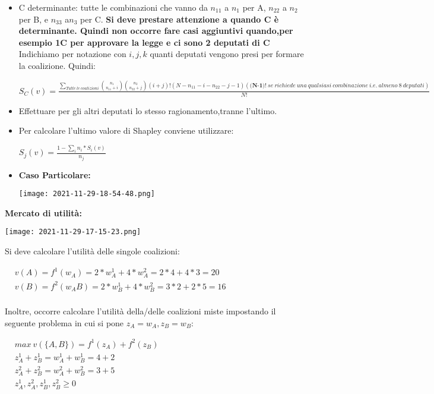\documentclass{article}
\theoremstyle{definition}
\theoremstyle{remark}
\begin{document}
\begin{itemize}
    \item C determinante: tutte le combinazioni che vanno da \(n_11\) a \(n_1\) per A, \(n_22\) a \(n_2\) per B, e \(n_33\) a\(n_3\) per C.\newline
    \textbf{Si deve prestare attenzione a quando C è determinante. Quindi non occorre fare casi aggiuntivi quando,per esempio 1C per approvare la legge e ci sono 2 deputati di C}\newline
    Indichiamo per notazione con \(i,j,k\) quanti deputati vengono presi per formare la coalizione. Quindi:
    \begin{center}
        \(S_C(v)=\frac{\sum_{Tutte\ le\ coalizioni}\binom{n_1}{n_{11}+i}\binom{n_2}{n_{22}+j}(i+j)!(N-n_{11}-i-n_{22}-j-1) (\textbf{(N-1)!}\ se\ richiede\ una\ qualsiasi\ combinazione\ i.e.\ almeno\ 8\ deputati)}{N!}\)
    \end{center}
    \item Effettuare per gli altri deputati lo stesso ragionamento,tranne l'ultimo.
    \item Per calcolare l'ultimo valore di Shapley conviene utilizzare:
    \begin{center}
        \(S_j(v)=\frac{1-\sum_{i}n_i*S_i(v)}{n_j}\)
    \end{center}
    \item \textbf{Caso Particolare:}\begin{center}
        \texttt{[image: 2021-11-29-18-54-48.png]}
    \end{center}
\end{itemize}
\textbf{Mercato di utilità:}
\begin{center}
    \texttt{[image: 2021-11-29-17-15-23.png]}
\end{center}
Si deve calcolare l'utilità delle singole coalizioni:
\begin{center}
    $\begin{aligned}
        & v(A)=f^1(w_A)=2*w_A^1+4*w_A^2=2*4+4*3=20\\
        & v(B)=f^2(w_AB)=2*w_B^1+4*w_B^2=3*2+2*5=16\\
    \end{aligned}$
\end{center}
Inoltre, occorre calcolare l'utilità della/delle coalizioni miste impostando il seguente problema in cui si pone \(z_A=w_A,z_B=w_B\):
\begin{center}
    $\begin{aligned}
        & max\ v(\{A,B\})= f^1(z_A)+f^2(z_B)\\
        & z_A^1+z_B^1=w_A^1+w_B^1=4+2\\
        & z_A^2+z_B^2=w_A^2+w_B^2=3+5\\
        & z_A^1,z_A^2,z_B^1,z_B^2\geq 0
    \end{aligned}$
\end{center}
\end{document}
